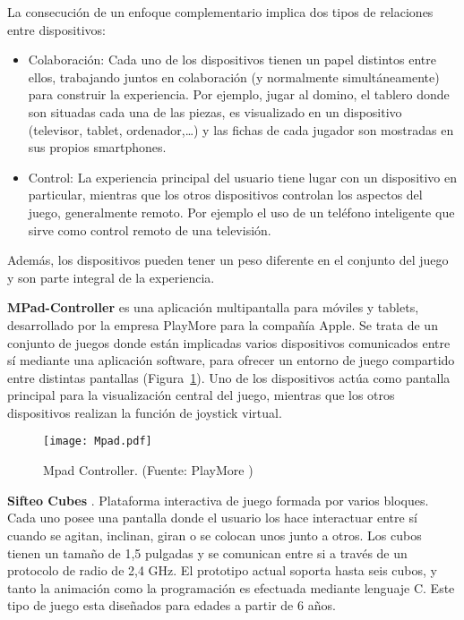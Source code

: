 La consecución de un enfoque complementario implica dos tipos de relaciones entre dispositivos:
\begin{itemize}
\item Colaboración: Cada uno de los dispositivos tienen un papel distintos entre ellos, trabajando juntos en colaboración (y normalmente simultáneamente) para construir la experiencia. Por ejemplo, jugar al domino, el tablero donde son situadas cada una de las piezas, es visualizado en un dispositivo (televisor, tablet, ordenador,…) y las fichas de cada jugador son mostradas en sus propios smartphones.

\item Control: La experiencia principal del usuario tiene lugar con un dispositivo en particular, mientras que los otros dispositivos controlan los aspectos del juego, generalmente remoto. Por ejemplo el uso de un teléfono inteligente que sirve como control remoto de una televisión.
\end{itemize}
Además, los dispositivos pueden tener un peso diferente en el conjunto del juego y son parte integral de la experiencia. 


\textbf{MPad-Controller} es una aplicación multipantalla para móviles y tablets, desarrollado por la empresa PlayMore para la compañía Apple. Se trata de un conjunto de juegos donde están implicadas varios dispositivos comunicados entre sí mediante una aplicación software, para ofrecer un entorno de juego compartido entre distintas pantallas (Figura~\ref{fig:Mpad}). Uno de los dispositivos actúa como pantalla principal para la visualización central del juego, mientras que los otros dispositivos realizan la función de joystick virtual.

\begin{figure}[!h]
\begin{center}
\texttt{[image: Mpad.pdf]}
\caption{Mpad Controller. (Fuente: PlayMore \cite{Mpad})}
\label{fig:Mpad}
\end{center}
\end{figure}


\textbf{Sifteo Cubes} \cite{Merrill}. Plataforma interactiva de juego formada por varios bloques. Cada uno posee una pantalla donde el usuario los hace interactuar entre sí cuando se agitan, inclinan, giran o se colocan unos junto a otros. Los cubos tienen un tamaño de 1,5 pulgadas y se comunican entre si a través de un protocolo de radio de 2,4 GHz. El prototipo actual soporta hasta seis cubos, y tanto la animación como la programación es efectuada mediante lenguaje C.
Este tipo de juego esta diseñados para edades a partir de 6 años.

